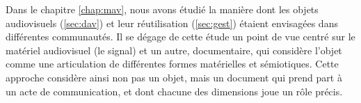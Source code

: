 


Dans le chapitre \ref{chap:mav}, nous avons étudié la manière dont les objets audiovisuels (\ref{sec:dav}) et leur réutilisation (\ref{sec:gest}) étaient envisagées dans différentes communautés.
Il se dégage de cette étude un point de vue centré sur le matériel audiovisuel (le signal) et un autre, documentaire, qui considère l'objet comme une articulation de différentes formes matérielles et sémiotiques. 
Cette approche considère ainsi non pas un objet, mais un document qui prend part à un acte de communication, et dont chacune des dimensions joue un rôle précis. 

